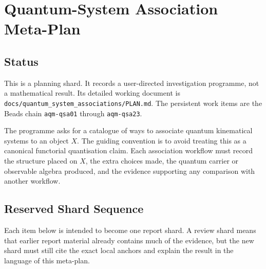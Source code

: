 
\section{Quantum-System Association Meta-Plan}
\label{sec:quantum-system-association-meta-plan}

\subsection{Status}

This is a planning shard.  It records a user-directed investigation programme,
not a mathematical result.  Its detailed working document is
\texttt{docs/quantum\_system\_associations/PLAN.md}.  The persistent work
items are the Beads chain \texttt{aqm-qsa01} through \texttt{aqm-qsa23}.

The programme asks for a catalogue of ways to associate quantum kinematical
systems to an object \(X\).  The guiding convention is to avoid treating this
as a canonical functorial quantisation claim.  Each association workflow must
record the structure placed on \(X\), the extra choices made, the quantum
carrier or observable algebra produced, and the evidence supporting any
comparison with another workflow.

\subsection{Reserved Shard Sequence}

Each item below is intended to become one report shard.  A review shard means
that earlier report material already contains much of the evidence, but the new
shard must still cite the exact local anchors and explain the result in the
language of this meta-plan.

